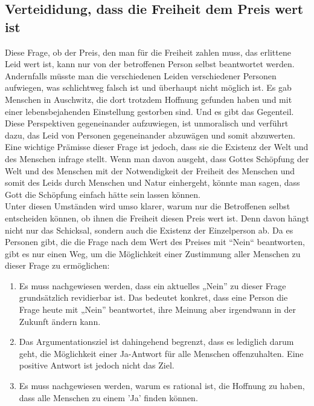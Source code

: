 \subsection{Verteididung, dass die Freiheit dem Preis wert ist} \label{Preis}
Diese Frage, ob der Preis, den man für die Freiheit zahlen muss, das erlittene Leid wert ist, kann nur von der betroffenen Person selbst beantwortet werden. Andernfalls müsste man die verschiedenen Leiden verschiedener Personen aufwiegen, was schlichtweg falsch ist und überhaupt nicht möglich ist. Es gab Menschen in Auschwitz, die dort trotzdem Hoffnung gefunden haben und mit einer lebensbejahenden Einstellung gestorben sind. Und es gibt das Gegenteil. Diese Perspektiven gegeneinander aufzuwiegen, ist unmoralisch und verführt dazu, das Leid von Personen gegeneinander abzuwägen und somit abzuwerten. \\

Eine wichtige Prämisse dieser Frage ist jedoch, dass sie die Existenz der Welt und des Menschen infrage stellt. Wenn man davon ausgeht, dass Gottes Schöpfung der Welt und des Menschen mit der Notwendigkeit der Freiheit des Menschen und somit des Leids durch Menschen und Natur einhergeht, könnte man sagen, dass Gott die Schöpfung einfach hätte sein lassen können. \\

Unter diesen Umständen wird umso klarer, warum nur die Betroffenen selbst entscheiden können, ob ihnen die Freiheit diesen Preis wert ist. Denn davon hängt nicht nur das Schicksal, sondern auch die Existenz der Einzelperson ab. Da es Personen gibt, die die Frage nach dem Wert des Preises mit ``Nein`` beantworten, gibt es nur einen Weg, um die Möglichkeit einer Zustimmung aller Menschen zu dieser Frage zu ermöglichen:
\begin{enumerate}
	\item Es muss nachgewiesen werden, dass ein aktuelles „Nein” zu dieser Frage grundsätzlich revidierbar ist. Das bedeutet konkret, dass eine Person die Frage heute mit „Nein” beantwortet, ihre Meinung aber irgendwann in der Zukunft ändern kann.
    \item Das Argumentationsziel ist dahingehend begrenzt, dass es lediglich darum geht, die Möglichkeit einer Ja-Antwort für alle Menschen offenzuhalten. Eine positive Antwort ist jedoch nicht das Ziel.
    \item Es muss nachgewiesen werden, warum es rational ist, die Hoffnung zu haben, dass alle Menschen zu einem 'Ja' finden können.
\end{enumerate}

